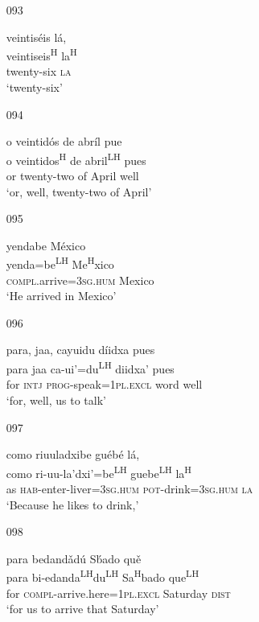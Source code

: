 \begin{itemize}
\item[093]
 
\glll   veintis\'{e}is l\'{a}, \\
 veintiseis\textsuperscript{H} la\textsuperscript{H}\\
 twenty-six \textsc{la}\\
\glt `twenty-six'
 


\item[094]
 
\glll   o veintid\'{o}s de abr\'{i}l pue\\
o veintidos\textsuperscript{H} de abril\textsuperscript{LH} pues\\
 or twenty-two of April well\\
\glt `or, well, twenty-two of April'
 


\item[095]
 
\glll   yendabe M\'{e}xico \\
yenda=be\textsuperscript{LH} Me\textsuperscript{H}xico\\
\textsc{compl}.arrive=\textsc{3sg.hum} Mexico\\
\glt `He arrived in Mexico'
 

\item[096]
 
\glll   para, jaa, cayuidu d\'{i}idxa pues \\
para jaa ca-ui'=du\textsuperscript{LH} diidxa' pues \\
for \textsc{intj} \textsc{prog}-speak=\textsc{1pl.excl} word well\\
\glt `for, well, us to talk'
 

\item[097]
 
\glll   como riuuladxibe gu\'{e}b\'{e} l\'{a},\\
como ri-uu-la'dxi'=be\textsuperscript{LH} guebe\textsuperscript{LH} la\textsuperscript{H}\\
as \textsc{hab}-enter-liver=\textsc{3sg.hum} \textsc{pot}-drink=\textsc{3sg.hum} \textsc{la}\\
\glt `Because he likes to drink,'
 

\item[098]
 
\glll   para bedand\v{a}d\'{u} S\'{b}ado qu\v{e} \\
para bi-edanda\textsuperscript{LH}du\textsuperscript{LH} Sa\textsuperscript{H}bado que\textsuperscript{LH} \\
for \textsc{compl}-arrive.here=\textsc{1pl.excl} Saturday \textsc{dist}\\
\glt `for us to arrive that Saturday'
 



\end{itemize}
